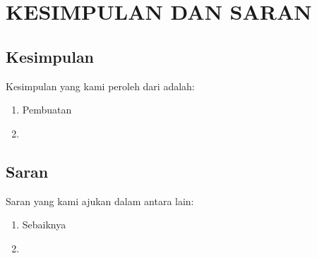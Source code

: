 \chapter{KESIMPULAN DAN SARAN}
\vspace{4ex}

\setlength{\parindent}{7ex}

\section{Kesimpulan}
\vspace{1ex}

Kesimpulan yang kami peroleh dari \lipsum[1][1] adalah:
\vspace{0.5ex}

\begin{enumerate}[nolistsep]

  \item Pembuatan \lipsum[1][1-2]
  \vspace{0.5ex}

  \item \lipsum[1][3-4]
  \vspace{0.5ex}

\end{enumerate}
\vspace{0.5ex}

\section{Saran}
\vspace{1ex}

Saran yang kami ajukan dalam \lipsum[1][1] antara lain:
\vspace{0.5ex}

\begin{enumerate}[nolistsep]

  \item Sebaiknya \lipsum[1][1-2]
  \vspace{0.5ex}

  \item \lipsum[1][3-4]
  \vspace{0.5ex}

\end{enumerate}
\vspace{0.5ex}